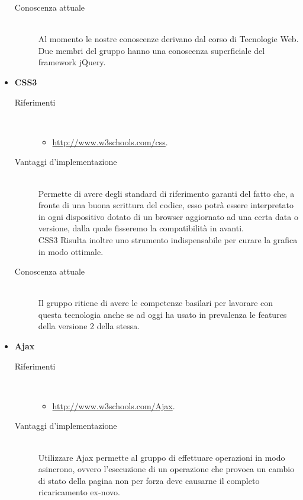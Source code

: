 \begin{itemize}
\begin{description}
		\item[Conoscenza attuale]\ \\ 
		\noindent Al momento le nostre conoscenze derivano dal corso di Tecnologie Web. \\ Due membri del gruppo hanno una conoscenza superficiale del framework jQuery.
	\end{description}
	
	\item \textbf{CSS3}
	\begin{description}
		\item[Riferimenti]\ 
		\noindent\begin{itemize}
			\item \url{http://www.w3schools.com/css}.
		\end{itemize}
		
		\item[Vantaggi d'implementazione]\ \\ 
		\noindent Permette di avere degli standard di riferimento garanti del fatto che, a fronte di una buona scrittura del codice, esso potrà essere interpretato in ogni dispositivo dotato di un browser aggiornato ad una certa data o versione, dalla quale fisseremo la compatibilità in avanti. \\ CSS3 Risulta inoltre uno strumento indispensabile per curare la grafica in modo ottimale.
		
		\item[Conoscenza attuale]\ \\ 
		\noindent Il gruppo ritiene di avere le competenze basilari per lavorare con questa tecnologia anche se ad oggi ha usato in prevalenza le features della versione 2 della stessa.
	\end{description}
	
	\item \textbf{Ajax}
	\begin{description}
		\item[Riferimenti]\ 
		\noindent\begin{itemize}
			\item \url{http://www.w3schools.com/Ajax}.
		\end{itemize}
		
		\item[Vantaggi d'implementazione]\ \\ 
		\noindent Utilizzare Ajax permette al gruppo di effettuare operazioni in modo asincrono, ovvero l'esecuzione di un operazione che provoca un cambio di stato della pagina non per forza deve causarne il completo ricaricamento ex-novo.
		

\end{description}
\end{itemize}
